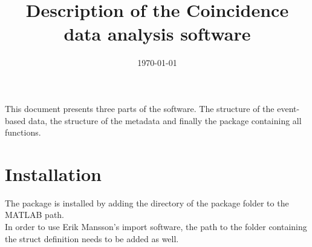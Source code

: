 \newpage


\title{Description of the Coincidence data analysis software}
\date{\today} %


\maketitle
\tableofcontents
\newpage

This document presents three parts of the software. The structure of the event-based data, the structure of the metadata and finally the package containing all functions.







\section{Installation}
The package is installed by adding the directory of the package folder to the MATLAB path.\\
In order to use Erik Mansson's import software, the path to the folder containing the struct definition needs to be added as well.


